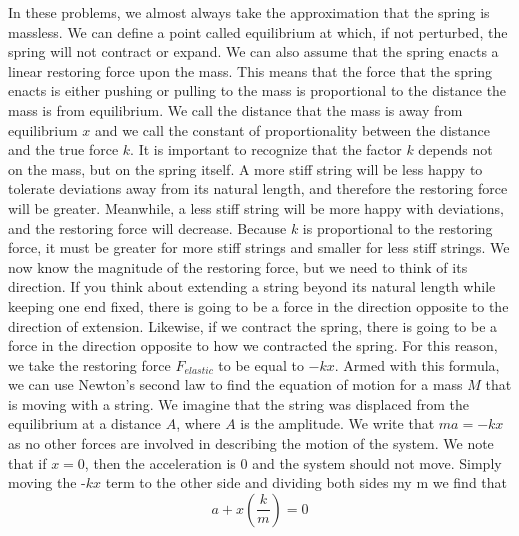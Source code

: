 \documentclass{article}[gray]
\numberwithin{equation}{subsection}
\begin{document}
In these problems, we almost always take the approximation that the spring is massless. We can define a point called equilibrium at which, if not perturbed, the spring will not contract or expand. We can also assume that the spring enacts a linear restoring force upon the mass. This means that the force that the spring enacts is either pushing or pulling to the mass is proportional to the distance the mass is from equilibrium. We call the distance that the mass is away from equilibrium $x$ and we call the constant of proportionality between the distance and the true force $k$. It is important to recognize that the factor $k$ depends not on the mass, but on the spring itself. A more stiff string will be less happy to tolerate deviations away from its natural length, and therefore the restoring force will be greater. Meanwhile, a less stiff string will be more happy with deviations, and the restoring force will decrease. Because $k$ is proportional to the restoring force, it must be greater for more stiff strings and smaller for less stiff strings. 
We now know the magnitude of the restoring force, but we need to think of its direction. If you think about extending a string beyond its natural length while keeping one end fixed, there is going to be a force in the direction opposite to the direction of extension. Likewise, if we contract the spring, there is going to be a force in the direction opposite to how we contracted the spring. For this reason, we take the restoring force $F_{elastic}$ to be equal to $-kx$. Armed with this formula, we can use Newton’s second law to find the equation of motion for a mass $M$ that is moving with a string. We imagine that the string was displaced from the equilibrium at a distance $A$, where $A$ is the amplitude. We write that $ma=-kx$ as no other forces are involved in describing the motion of the system. We note that if $x=0$, then the acceleration is 0 and the system should not move. Simply moving the -$kx$ term to the other side and dividing both sides my m we find that \begin{equation}a+x\left(\frac{k}{m}\right)=0\end{equation}
\end{document}
